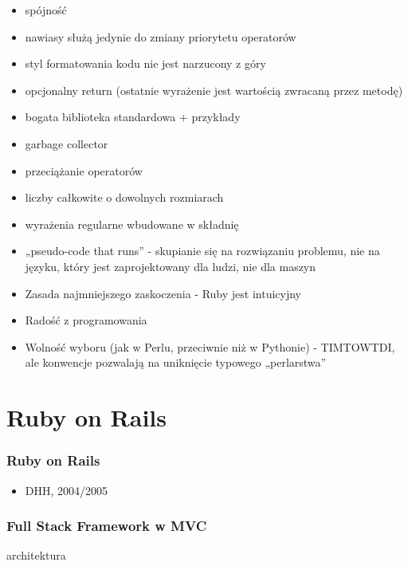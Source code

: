 \documentclass[12t]{beamer}
\begin{document}
\begin{frame}
  \begin{itemize}
  \item spójność
  \item nawiasy służą jedynie do zmiany priorytetu operatorów
  \item styl formatowania kodu nie jest narzucony z góry
  \item opcjonalny return (ostatnie wyrażenie jest wartością zwracaną
    przez metodę)
  \item bogata biblioteka standardowa + przykłady
  \item garbage collector
  \item przeciążanie operatorów
  \item liczby całkowite o dowolnych rozmiarach
  \item wyrażenia regularne wbudowane w składnię
  \end{itemize}
\end{frame}

\begin{frame}
  \begin{itemize}
  \item „pseudo-code that runs” - skupianie się na rozwiązaniu
    problemu, nie na języku, który jest zaprojektowany dla ludzi, nie
    dla maszyn
  \item Zasada najmniejszego zaskoczenia - Ruby jest intuicyjny
  \item Radość z programowania
  \item Wolność wyboru (jak w Perlu, przeciwnie niż w Pythonie) -
    TIMTOWTDI, ale konwencje pozwalają na uniknięcie typowego
    „perlarstwa”
  \end{itemize}
\end{frame}

\section{Ruby on Rails}
\begin{frame}
  \frametitle{Ruby on Rails}
  \begin{itemize}
  \item DHH, 2004/2005
  \end{itemize}
\end{frame}

\begin{frame}
  \frametitle{Full Stack Framework w MVC}
  architektura
\end{frame}
\end{document}
